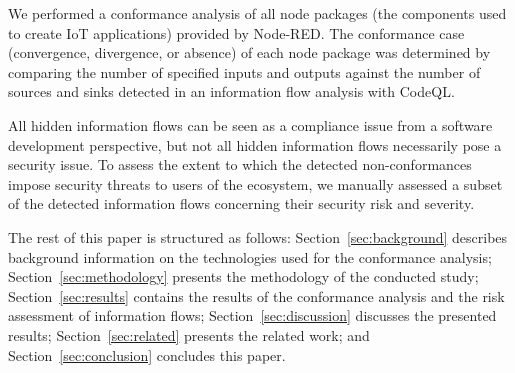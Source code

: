 \vspace{2mm}
\noindent
{}%

\vspace{2mm}
\noindent 
We performed a conformance analysis of all node packages (the components used to create IoT applications) provided by Node-RED.
The conformance case (convergence, divergence, or absence) of each node package was determined by comparing the number of specified inputs and outputs against the number of sources and sinks detected in an information flow analysis with CodeQL.


\vspace{2mm}
\noindent
{}%

\vspace{2mm}
\noindent 
All hidden information flows can be seen as a compliance issue from a software development perspective, but not all hidden information flows necessarily pose a security issue.
To assess the extent to which the detected non-conformances impose security threats to users of the ecosystem, we manually assessed a subset of the detected information flows concerning their security risk and severity.





\vspace{2mm}




The rest of this paper is structured as follows: Section~\ref{sec:background} describes background information on the technologies used for the conformance analysis; Section~\ref{sec:methodology} presents the methodology of the conducted study; Section~\ref{sec:results} contains the results of the conformance analysis and the risk assessment of information flows; Section~\ref{sec:discussion} discusses the presented results; Section~\ref{sec:related} presents the related work; and Section~\ref{sec:conclusion} concludes this paper.


